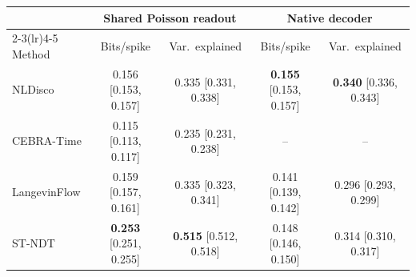 \begin{tabular}{lcccc}
\toprule
& \multicolumn{2}{c}{Shared Poisson readout} & \multicolumn{2}{c}{Native decoder} \\
\cmidrule(lr){2-3}\cmidrule(lr){4-5}
Method & Bits/spike & Var.\ explained & Bits/spike & Var.\ explained \\
\midrule
NLDisco & 0.156 {\scriptsize [0.153, 0.157]} & 0.335 {\scriptsize [0.331, 0.338]} & \textbf{0.155} {\scriptsize [0.153, 0.157]} & \textbf{0.340} {\scriptsize [0.336, 0.343]} \\
CEBRA-Time & 0.115 {\scriptsize [0.113, 0.117]} & 0.235 {\scriptsize [0.231, 0.238]} & -- & -- \\
LangevinFlow & 0.159 {\scriptsize [0.157, 0.161]} & 0.335 {\scriptsize [0.323, 0.341]} & 0.141 {\scriptsize [0.139, 0.142]} & 0.296 {\scriptsize [0.293, 0.299]} \\
ST-NDT & \textbf{0.253} {\scriptsize [0.251, 0.255]} & \textbf{0.515} {\scriptsize [0.512, 0.518]} & 0.148 {\scriptsize [0.146, 0.150]} & 0.314 {\scriptsize [0.310, 0.317]} \\
\bottomrule
\end{tabular}
